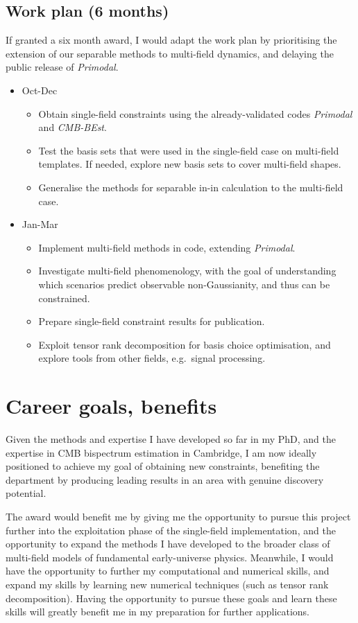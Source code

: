 \subsection*{Work plan (6 months)}
If granted a six month award, I would adapt the work plan by prioritising the
extension of our separable methods to multi-field dynamics, and delaying the 
public release of \textit{Primodal}.
\begin{itemize}
	\item Oct-Dec
	\begin{itemize}
        \item Obtain single-field constraints using the already-validated codes \textit{Primodal} and \textit{CMB-BEst}.
        \item Test the basis sets that were used in the single-field case on multi-field templates.
            If needed, explore new basis sets to cover multi-field shapes.
        \item Generalise the methods for separable in-in calculation to the multi-field case.
	\end{itemize}
	\item Jan-Mar
	\begin{itemize}
        \item Implement multi-field methods in code, extending \textit{Primodal}.
        \item Investigate multi-field phenomenology, with the goal of understanding which scenarios predict observable non-Gaussianity, and thus can be constrained.
        \item Prepare single-field constraint results for publication.
        \item Exploit tensor rank decomposition for basis choice optimisation, and explore tools from other fields, e.g.~signal processing.
	\end{itemize}
\end{itemize}


\section*{Career goals, benefits}
Given the methods and expertise I have developed so far in my PhD,
and the expertise in CMB bispectrum estimation in Cambridge, I am now ideally
positioned to achieve my goal of obtaining new constraints,
benefiting the department by producing leading results in an area with genuine discovery potential.

The award would benefit me by giving me the opportunity to pursue this project further
into the exploitation phase of the single-field implementation,
and the opportunity to expand the methods I have developed to the broader class
of multi-field models of fundamental early-universe physics.
Meanwhile, I would have the opportunity to further my computational
and numerical skills, and expand my skills by learning new
numerical techniques (such as tensor rank decomposition).
Having the opportunity to pursue these goals and learn these skills will greatly benefit
me in my preparation for further applications.
